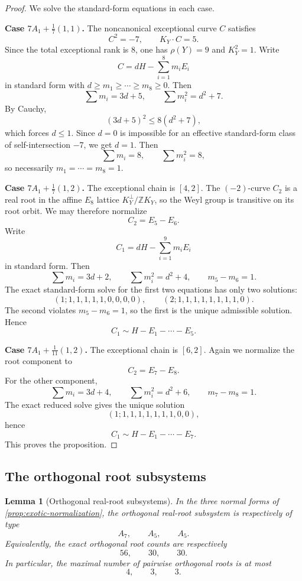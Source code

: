 \documentclass[11pt]{article}
\newtheorem{lemma}[theorem]{Lemma}
\theoremstyle{definition}
\newcommand{\Zbb}{\mathbb Z}
\begin{document}
\begin{proof}
We solve the standard-form equations in each case.

\medskip
\noindent
\textbf{Case $7A_1+\frac17(1,1)$.}
The noncanonical exceptional curve $C$ satisfies
\[
C^2=-7,\qquad K_Y\cdot C=5.
\]
Since the total exceptional rank is $8$, one has $\rho(Y)=9$ and $K_Y^2=1$. Write
\[
C=dH-\sum_{i=1}^8m_iE_i
\]
in standard form with $d\ge m_1\ge \cdots\ge m_8\ge 0$. Then
\[
\sum m_i=3d+5,\qquad \sum m_i^2=d^2+7.
\]
By Cauchy,
\[
(3d+5)^2\le 8(d^2+7),
\]
which forces $d\le 1$. Since $d=0$ is impossible for an effective standard-form class of self-intersection $-7$, we get $d=1$. Then
\[
\sum m_i=8,\qquad \sum m_i^2=8,
\]
so necessarily $m_1=\cdots=m_8=1$.

\medskip
\noindent
\textbf{Case $7A_1+\frac17(1,2)$.}
The exceptional chain is $[4,2]$. The $(-2)$-curve $C_2$ is a real root in the affine $E_8$ lattice $K_Y^{\perp}/\Zbb K_Y$, so the Weyl group is transitive on its root orbit. We may therefore normalize
\[
C_2=E_5-E_6.
\]
Write
\[
C_1=dH-\sum_{i=1}^9m_iE_i
\]
in standard form. Then
\[
\sum m_i=3d+2,\qquad \sum m_i^2=d^2+4,\qquad m_5-m_6=1.
\]
The exact standard-form solve for the first two equations has only two solutions:
\[
(1;1,1,1,1,1,0,0,0,0),\qquad (2;1,1,1,1,1,1,1,1,0).
\]
The second violates $m_5-m_6=1$, so the first is the unique admissible solution. Hence
\[
C_1\sim H-E_1-\cdots-E_5.
\]

\medskip
\noindent
\textbf{Case $7A_1+\frac1{11}(1,2)$.}
The exceptional chain is $[6,2]$. Again we normalize the root component to
\[
C_2=E_7-E_8.
\]
For the other component,
\[
\sum m_i=3d+4,\qquad \sum m_i^2=d^2+6,\qquad m_7-m_8=1.
\]
The exact reduced solve gives the unique solution
\[
(1;1,1,1,1,1,1,1,0,0),
\]
hence
\[
C_1\sim H-E_1-\cdots-E_7.
\]
This proves the proposition.
\end{proof}

\subsection{The orthogonal root subsystems}

\begin{lemma}[Orthogonal real-root subsystems]\label{lem:exotic-root-types}
In the three normal forms of \cref{prop:exotic-normalization}, the orthogonal real-root subsystem is respectively of type
\[
A_7,\qquad A_5,\qquad A_5.
\]
Equivalently, the exact orthogonal root counts are respectively
\[
56,\qquad 30,\qquad 30.
\]
In particular, the maximal number of pairwise orthogonal roots is at most
\[
4,\qquad 3,\qquad 3.
\]
\end{lemma}
\end{document}
